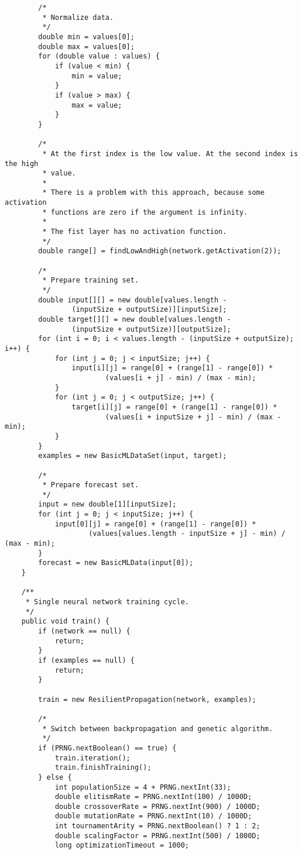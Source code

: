 \begin{verbatim}
        /*
         * Normalize data.
         */
        double min = values[0];
        double max = values[0];
        for (double value : values) {
            if (value < min) {
                min = value;
            }
            if (value > max) {
                max = value;
            }
        }

        /*
         * At the first index is the low value. At the second index is the high
         * value.
         *
         * There is a problem with this approach, because some activation
         * functions are zero if the argument is infinity.
         *
         * The fist layer has no activation function.
         */
        double range[] = findLowAndHigh(network.getActivation(2));

        /*
         * Prepare training set.
         */
        double input[][] = new double[values.length -
                (inputSize + outputSize)][inputSize];
        double target[][] = new double[values.length -
                (inputSize + outputSize)][outputSize];
        for (int i = 0; i < values.length - (inputSize + outputSize); i++) {
            for (int j = 0; j < inputSize; j++) {
                input[i][j] = range[0] + (range[1] - range[0]) *
                        (values[i + j] - min) / (max - min);
            }
            for (int j = 0; j < outputSize; j++) {
                target[i][j] = range[0] + (range[1] - range[0]) *
                        (values[i + inputSize + j] - min) / (max - min);
            }
        }
        examples = new BasicMLDataSet(input, target);

        /*
         * Prepare forecast set.
         */
        input = new double[1][inputSize];
        for (int j = 0; j < inputSize; j++) {
            input[0][j] = range[0] + (range[1] - range[0]) *
                    (values[values.length - inputSize + j] - min) / (max - min);
        }
        forecast = new BasicMLData(input[0]);
    }

    /**
     * Single neural network training cycle.
     */
    public void train() {
        if (network == null) {
            return;
        }
        if (examples == null) {
            return;
        }

        train = new ResilientPropagation(network, examples);

        /*
         * Switch between backpropagation and genetic algorithm.
         */
        if (PRNG.nextBoolean() == true) {
            train.iteration();
            train.finishTraining();
        } else {
            int populationSize = 4 + PRNG.nextInt(33);
            double elitismRate = PRNG.nextInt(100) / 1000D;
            double crossoverRate = PRNG.nextInt(900) / 1000D;
            double mutationRate = PRNG.nextInt(10) / 1000D;
            int tournamentArity = PRNG.nextBoolean() ? 1 : 2;
            double scalingFactor = PRNG.nextInt(500) / 1000D;
            long optimizationTimeout = 1000;


\end{verbatim}

